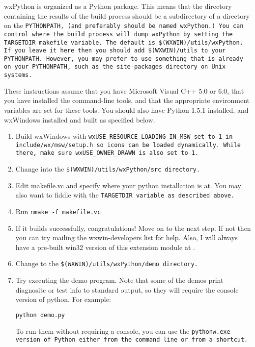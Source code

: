 wxPython is organized as a Python package.  This means that the
directory containing the results of the build process should be a
subdirectory of a directory on the \tt{PYTHONPATH}, (and preferably
should be named wxPython.)  You can control where the build process
will dump wxPython by setting the \tt{TARGETDIR} makefile variable.
The default is \tt{\$(WXWIN)/utils/wxPython}.  If you leave it here
then you should add \tt{\$(WXWIN)/utils} to your \tt{PYTHONPATH}.
However, you may prefer to use something that is already on your
\tt{PYTHONPATH}, such as the \tt{site-packages} directory on Unix
systems.


These instructions assume that you have Microsoft Visual C++ 5.0 or
6.0, that you have installed the command-line tools, and that the
appropriate environment variables are set for these tools.  You should
also have Python 1.5.1 installed, and wxWindows installed and built as
specified below.

\begin{enumerate}\itemsep=0pt
\item Build wxWindows with \tt{wxUSE_RESOURCE_LOADING_IN_MSW} set to 1 in
\tt{include/wx/msw/setup.h} so icons can be loaded dynamically.  While
there, make sure \tt{wxUSE_OWNER_DRAWN} is also set to 1.
\item Change into the \tt{\$(WXWIN)/utils/wxPython/src} directory.
\item Edit makefile.vc and specify where your python installation is at.
You may also want to fiddle with the \tt{TARGETDIR} variable as described
above.
\item Run \tt{nmake -f makefile.vc}
\item If it builds successfully, congratulations!  Move on to the next
step.  If not then you can try mailing the wxwin-developers list for
help.  Also, I will always have a pre-built win32 version of this extension module at
.
\item Change to the \tt{\$(WXWIN)/utils/wxPython/demo} directory.
\item Try executing the demo program.  Note that some of the demos print
diagnositc or test info to standard output, so they will require the
console version of python.  For example:

\tt{python demo.py}

To run them without requiring a console, you can use the \tt{pythonw.exe}
version of Python either from the command line or from a shortcut.
\end{enumerate}

